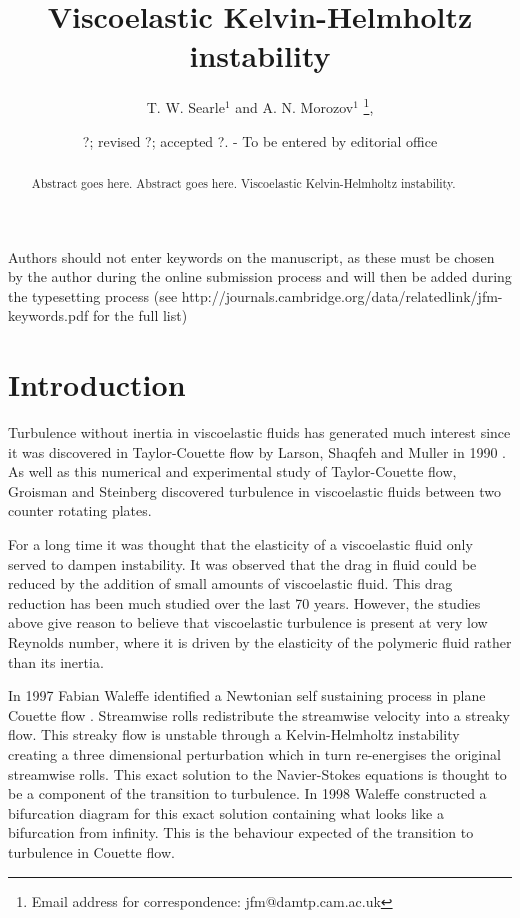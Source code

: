 \documentclass{jfm}
\title[Viscoelastic Kelvin-Helmholtz instabilty]{Viscoelastic Kelvin-Helmholtz instability}
\author[T. W. Searle and A. N. Morozov]%
{T. W. Searle$^1$ and A. N. Morozov$^1$%
  \thanks{Email address for correspondence: jfm@damtp.cam.ac.uk},\ns
}
\affiliation{$^1$SUPA, School of Physics and Astronomy, University of Edinburgh, Mayfield Road,
Edinburgh, EH9 3JZ, UK\\[\affilskip]
}
\date{?; revised ?; accepted ?. - To be entered by editorial office}
\begin{document}
\maketitle

\begin{abstract}
  Abstract goes here. Abstract goes here. Viscoelastic Kelvin-Helmholtz instability. 
\end{abstract}

\begin{keywords}
Authors should not enter keywords on the manuscript, as these must be chosen by the author during the online submission process and will then be added during the typesetting process (see http://journals.cambridge.org/data/\linebreak[3]relatedlink/jfm-\linebreak[3]keywords.pdf for the full list)
\end{keywords}

\section{Introduction}

Turbulence without inertia in viscoelastic fluids has generated much interest since it was discovered in Taylor-Couette flow by Larson, Shaqfeh and Muller in 1990 \cite{Larson1990}. As well as this numerical and experimental study of Taylor-Couette flow, Groisman and Steinberg \cite{Groisman2000} discovered turbulence in viscoelastic fluids between two counter rotating plates.

For a long time it was thought that the elasticity of a viscoelastic fluid only served to dampen instability. It was observed that the drag in fluid could be reduced by the addition of small amounts of viscoelastic fluid. This drag reduction has been much studied over the last 70 years. However, the studies above give reason to believe that viscoelastic turbulence is present at very low Reynolds number, where it is driven by the elasticity of the polymeric fluid rather than its inertia.

In 1997 Fabian Waleffe identified a Newtonian self sustaining process in plane Couette flow \cite{Waleffe97}. Streamwise rolls redistribute the streamwise velocity into a streaky flow. This streaky flow is unstable through a Kelvin-Helmholtz instability creating a three dimensional perturbation which in turn re-energises the original streamwise rolls. This exact solution to the Navier-Stokes equations is thought to be a component of the transition to turbulence. In 1998 Waleffe constructed a bifurcation diagram for this exact solution \cite{Waleffe98} containing what looks like a bifurcation from infinity. This is the behaviour expected of the transition to turbulence in Couette flow.
\end{document}
